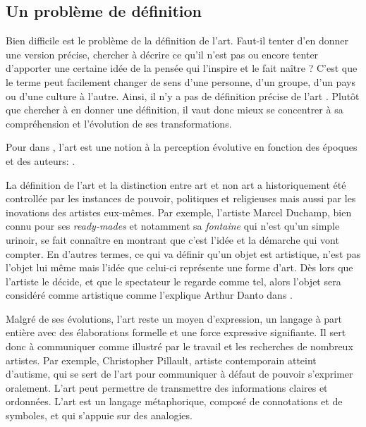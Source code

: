 \documentclass[12pt]{article} %
\begin{document}
\subsection{Un problème de définition}
Bien difficile est le problème de la définition de l'art. Faut-il tenter d'en donner une version précise, chercher à décrire ce qu'il n'est pas ou encore tenter d'apporter une certaine idée de la pensée qui l'inspire et le fait naître ? C'est que le terme peut facilement changer de sens d'une personne, d'un groupe, d'un pays ou d'une culture à l'autre. Ainsi, il n'y a pas de définition précise de l'art \cite{SDavies1991}. Plutôt que chercher à en donner une définition, il vaut donc mieux se concentrer à sa compréhension et l'évolution de ses transformations. 

Pour \citeauthor{SDavies1991} dans , l'art est une notion à la perception évolutive en fonction des époques et des auteurs:  \cite{SDavies1991}. 

La définition de l'art et la distinction entre art et non art a historiquement été controllée par les instances de pouvoir, politiques et religieuses mais aussi par les inovations des artistes eux-mêmes. Par exemple, l'artiste Marcel Duchamp, bien connu pour ses \textit{ready-mades} et notamment sa \textit{fontaine} qui n'est qu'un simple urinoir, se fait connaître en montrant que c'est l'idée et la démarche qui vont compter. En d'autres termes, ce qui va définir qu'un objet est artistique, n'est pas l'objet lui même mais l'idée que celui-ci représente une forme d'art. Dès lors que l'artiste le décide, et que le spectateur le regarde comme tel, alors l'objet sera considéré comme artistique comme l'explique Arthur Danto dans  \cite{ADanto1989}. 

Malgré de ses évolutions, l'art reste un moyen d'expression, un langage à part entière avec des élaborations formelle et une force expressive signifiante. Il sert donc à communiquer comme illustré par le travail et les recherches de nombreux artistes. Par exemple, Christopher Pillault, artiste contemporain atteint d'autisme, qui se sert de l'art pour communiquer à défaut de pouvoir s'exprimer oralement. L'art peut permettre de transmettre des informations claires et ordonnées. L'art est un langage métaphorique, composé de connotations et de symboles, et qui s'appuie sur des analogies. 
\end{document}
